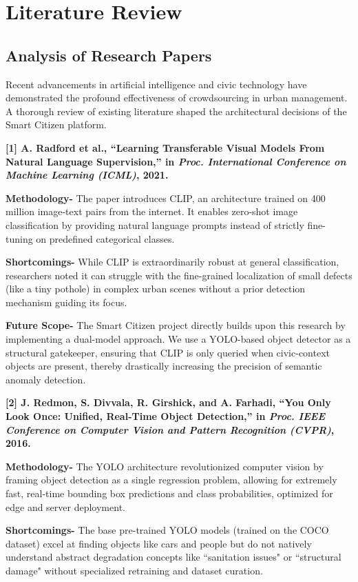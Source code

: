 \documentclass[12pt,a4paper]{report}
\begin{document}
\chapter{Literature Review}
\section{Analysis of Research Papers}
Recent advancements in artificial intelligence and civic technology have demonstrated the profound effectiveness of crowdsourcing in urban management. A thorough review of existing literature shaped the architectural decisions of the Smart Citizen platform.

\vspace{0.5cm}
\textbf{[1] A. Radford et al., ``Learning Transferable Visual Models From Natural Language Supervision,'' in \textit{Proc. International Conference on Machine Learning (ICML)}, 2021.}

\textbf{Methodology-} The paper introduces CLIP, an architecture trained on 400 million image-text pairs from the internet. It enables zero-shot image classification by providing natural language prompts instead of strictly fine-tuning on predefined categorical classes.

\textbf{Shortcomings-} While CLIP is extraordinarily robust at general classification, researchers noted it can struggle with the fine-grained localization of small defects (like a tiny pothole) in complex urban scenes without a prior detection mechanism guiding its focus.

\textbf{Future Scope-} The Smart Citizen project directly builds upon this research by implementing a dual-model approach. We use a YOLO-based object detector as a structural gatekeeper, ensuring that CLIP is only queried when civic-context objects are present, thereby drastically increasing the precision of semantic anomaly detection.

\vspace{0.5cm}
\textbf{[2] J. Redmon, S. Divvala, R. Girshick, and A. Farhadi, ``You Only Look Once: Unified, Real-Time Object Detection,'' in \textit{Proc. IEEE Conference on Computer Vision and Pattern Recognition (CVPR)}, 2016.}

\textbf{Methodology-} The YOLO architecture revolutionized computer vision by framing object detection as a single regression problem, allowing for extremely fast, real-time bounding box predictions and class probabilities, optimized for edge and server deployment.

\textbf{Shortcomings-} The base pre-trained YOLO models (trained on the COCO dataset) excel at finding objects like cars and people but do not natively understand abstract degradation concepts like ``sanitation issues" or ``structural damage" without specialized retraining and dataset curation.
\end{document}
